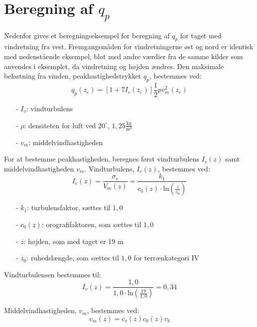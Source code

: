 \chapter{Beregning af $q_p$}
Nedenfor gives et beregningseksempel for beregning af $q_p$ for taget med vindretning fra vest. Fremgangsmåden for vindretningerne øst og nord er identisk med nedenstående eksempel, blot med andre værdier fra de samme kilder som anvendes i eksemplet, da vindretning og højden ændres.
\newline
\newline
Den maksimale belastning fra vinden, peakhastighedstrykket $q_p$, bestemmes ved:
\begin{equation}
	q_p(z_e)=[1+7I_v(z_e)]\frac{1}{2}pv_m^2(z_e)
\end{equation}
\begin{itemize}
	\item[-] $I_v$: vindturbulens
	\item[-] $\rho$: densiteten for luft ved $20^{\circ}$, $1,\!25 \frac{\text{kg}}{\text{m}^3}$
	\item[-] $v_m$: middelvindhastigheden
\end{itemize}
For at bestemme peakhastigheden, beregnes først vindturbulens $I_v(z)$ samt middelvindhastigheden $v_m$.
\newline
\newline
Vindturbulens, $I_v(z)$, bestemmes ved:
\begin{equation}
	I_v(z)=\frac{\sigma_v}{V_m(z)}=\frac{k_1}{c_0(z)\cdot \text{ln}(\frac{z}{z_0})}
\end{equation}
\begin{itemize}
	\item[-] $k_1$: turbulensfaktor, sættes til $1,\!0$ \citep[ kapitel 4.4]{EU91}
	\item[-] $c_0(z)$: orografifaktoren, som sættes til $1,\!0$ \citep[ kapitel 4.3.1]{EU91}
	\item[-] $z$: højden, som med taget er 19 m
	\item[-] $z_0$: ruhedslængde, som sættes til $1,\!0$ for terrænkategori IV \citep[ tabel 4.1 kapitel 4.3.2]{EU91}
\end{itemize}
Vindturbulensen bestemmes til:
\begin{equation}
	I_v(z)=\frac{1,\!0}{1,\!0\cdot \text{ln}(\frac{19}{1,0})}=0,\!34
\end{equation}

Middelvindhastigheden, $v_m$, bestemmes ved:
\begin{equation}
	v_m(z)=c_r(z)c_0(z)v_b
\end{equation}

